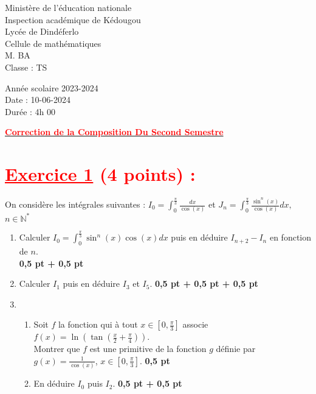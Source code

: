 \documentclass[12pt]{article}
\begin{document}
\begin{minipage}{0.5\textwidth}
	Ministère de l'éducation nationale  \\
	Inspection académique de Kédougou   \\
	Lycée de Dindéferlo            \\
	Cellule de mathématiques            \\
	M. BA                          \\
	Classe : TS  \\
\end{minipage}
\begin{minipage}{0.5\textwidth}
	Année scolaire 2023-2024 \\
	Date : 10-06-2024 \\
	Durée : 4h 00 \\
\end{minipage}

\begin{center}
	\textbf{{\underline{\textcolor{red}{Correction de la Composition Du Second Semestre}}}}
\end{center}
\section*{\textcolor{red}{\underline{Exercice 1} (4 points) :}}
On considère les intégrales suivantes : $I_{0}=\int_{0}^{\frac{\pi}{3}} \frac{dx}{\cos (x)}$ et $J_{n}=\int_{0}^{\frac{\pi}{3}} \frac{\sin^{n}(x)}{\cos(x)}dx,$ $n \in \mathbb{N}^{*}$

\begin{enumerate}
    \item Calculer $I_{0}=\int_{0}^{\frac{\pi}{3}} \sin^{n}(x)\cos(x)dx$ puis en déduire $I_{n+2}-I_{n}$ en fonction de $n$.\\ \textbf{0,5 pt + 0,5 pt}
    \item Calculer $I_{1}$ puis en déduire $I_{3}$ et $I_{5}$. \textbf{0,5 pt + 0,5 pt + 0,5 pt}
    \item 
    \begin{enumerate}
        \item Soit $f$ la fonction qui à tout $x \in \left[0, \frac{\pi}{3}\right]$ associe $f(x) = \ln\left( \tan\left(\frac{x}{2}+\frac{\pi}{4}\right)\right)$.\\ Montrer que $f$ est une primitive de la fonction $g$ définie par $g(x) = \frac{1}{\cos(x)}$, $x \in \left[0, \frac{\pi}{3}\right]$. \textbf{0,5 pt}
        \item En déduire $I_{0}$ puis $I_{2}$. \textbf{0,5 pt + 0,5 pt}
    \end{enumerate}
\end{enumerate}
\end{document}
